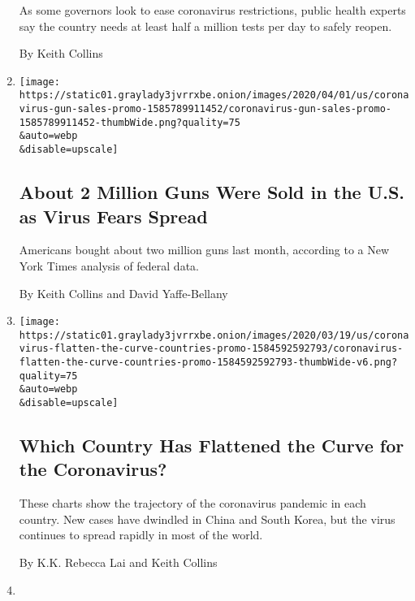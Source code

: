 \begin{enumerate}
  As some governors look to ease coronavirus restrictions, public health
  experts say the country needs at least half a million tests per day to
  safely reopen.

  By Keith Collins
\item
  \href{/interactive/2020/04/01/business/coronavirus-gun-sales.html}{}

  \texttt{[image: https://static01.graylady3jvrrxbe.onion/images/2020/04/01/us/coronavirus-gun-sales-promo-1585789911452/coronavirus-gun-sales-promo-1585789911452-thumbWide.png?quality=75\\\&auto=webp\\\&disable=upscale]}

  \hypertarget{about-2-million-guns-were-sold-in-the-us-as-virus-fears-spread}{%
  \subsection{About 2 Million Guns Were Sold in the U.S. as Virus Fears
  Spread}\label{about-2-million-guns-were-sold-in-the-us-as-virus-fears-spread}}

  Americans bought about two million guns last month, according to a New
  York Times analysis of federal data.

  By Keith Collins and David Yaffe-Bellany
\item
  \href{/interactive/2020/03/19/world/coronavirus-flatten-the-curve-countries.html}{}

  \texttt{[image: https://static01.graylady3jvrrxbe.onion/images/2020/03/19/us/coronavirus-flatten-the-curve-countries-promo-1584592592793/coronavirus-flatten-the-curve-countries-promo-1584592592793-thumbWide-v6.png?quality=75\\\&auto=webp\\\&disable=upscale]}

  \hypertarget{which-country-has-flattened-the-curve-for-the-coronavirus}{%
  \subsection{Which Country Has Flattened the Curve for the
  Coronavirus?}\label{which-country-has-flattened-the-curve-for-the-coronavirus}}

  These charts show the trajectory of the coronavirus pandemic in each
  country. New cases have dwindled in China and South Korea, but the
  virus continues to spread rapidly in most of the world.

  By K.K. Rebecca Lai and Keith Collins
\item
  \href{/interactive/2020/02/25/us/elections/debate-speaking-time.html}{}


\end{enumerate}
